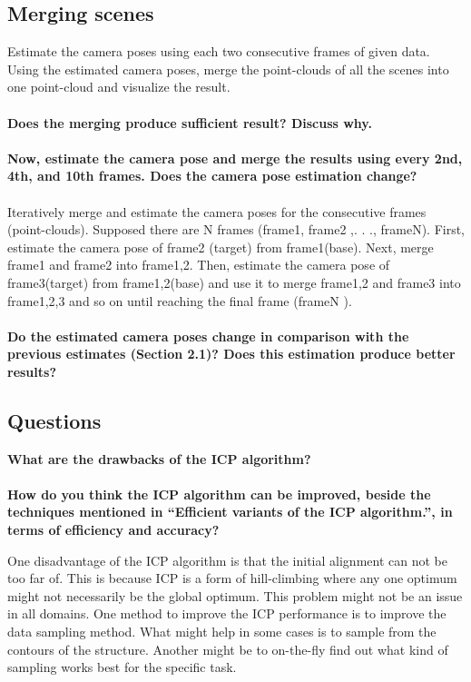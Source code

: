 \documentclass[12pt]{amsart}
\begin{document}
\subsection{Merging scenes}
Estimate the camera poses using each two consecutive frames of given data. Using the estimated camera poses, merge the point-clouds of all the scenes into one point-cloud and visualize the result. 
\\\\
\textbf{Does the merging produce sufficient result? Discuss why.}
\\\\
\textbf{Now, estimate the camera pose and merge the results using every 2nd, 4th, and 10th frames. Does the camera pose estimation change?}
\\\\
Iteratively merge and estimate the camera poses for the consecutive frames (point-clouds). Supposed there are N frames (frame1, frame2 ,. . ., frameN). First, estimate the camera pose of frame2 (target) from frame1(base). Next, merge frame1 and frame2 into frame1,2. Then, estimate the camera pose of frame3(target) from frame1,2(base) and use it to merge frame1,2 and frame3 into frame1,2,3 and so on until reaching the final frame (frameN ).\\\\ \textbf{Do the estimated camera poses change in comparison with the previous estimates (Section 2.1)? Does this estimation produce better results?}
\subsection{Questions}
\textbf{What are the drawbacks of the ICP algorithm?}\\\\
\textbf{How do you think the ICP algorithm can be improved, beside the techniques mentioned in ``Efficient variants of the ICP algorithm.'', in terms of efficiency and accuracy?}

One disadvantage of the ICP algorithm is that the initial alignment can not be too far of. This is because ICP is a form of hill-climbing where any one optimum might not necessarily be the global optimum. This problem might not be an issue in all domains. 
One method to improve the ICP performance is to improve the data sampling method. What might help in some cases is to sample from the contours of the structure. Another might be to on-the-fly find out what kind of sampling works best for the specific task.
\end{document}
